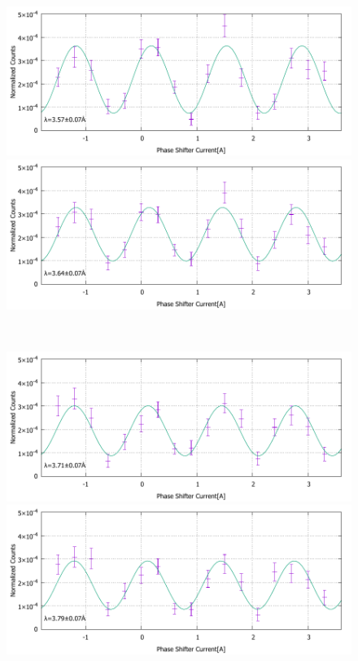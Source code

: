 \begin{figure}[h]
\begin{minipage}{0.5\hsize}
\end{minipage}\\
\begin{minipage}{0.5\hsize}
\includegraphics[width=\hsize]{discussion/IF_nb/Interference_nb_fit500.pdf}
\end{minipage}
\begin{minipage}{0.5\hsize}
\includegraphics[width=\hsize]{discussion/IF_nb/Interference_nb_fit510.pdf}
\end{minipage}\\
\begin{minipage}{0.5\hsize}
\includegraphics[width=\hsize]{discussion/IF_nb/Interference_nb_fit520.pdf}
\end{minipage}
\begin{minipage}{0.5\hsize}
\includegraphics[width=\hsize]{discussion/IF_nb/Interference_nb_fit530.pdf}

\end{minipage}
\end{figure}
